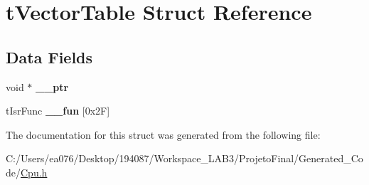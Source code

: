 \hypertarget{structt_vector_table}{\section{t\-Vector\-Table Struct Reference}
\label{structt_vector_table}
}
\subsection*{Data Fields}
\begin{DoxyCompactItemize}
\item 
\hypertarget{structt_vector_table_a324d365e9c8c6c033f4edbc906f94844}{void $\ast$ {\bfseries \-\_\-\-\_\-ptr}}\label{structt_vector_table_a324d365e9c8c6c033f4edbc906f94844}

\item 
\hypertarget{structt_vector_table_aeef9a059db36607f5d6f00cfc5a50f4e}{t\-Isr\-Func {\bfseries \-\_\-\-\_\-fun} \mbox{[}0x2\-F\mbox{]}}\label{structt_vector_table_aeef9a059db36607f5d6f00cfc5a50f4e}

\end{DoxyCompactItemize}


The documentation for this struct was generated from the following file\-:\begin{DoxyCompactItemize}
\item 
C\-:/\-Users/ea076/\-Desktop/194087/\-Workspace\-\_\-\-L\-A\-B3/\-Projeto\-Final/\-Generated\-\_\-\-Code/\hyperlink{_cpu_8h}{Cpu.\-h}\end{DoxyCompactItemize}

